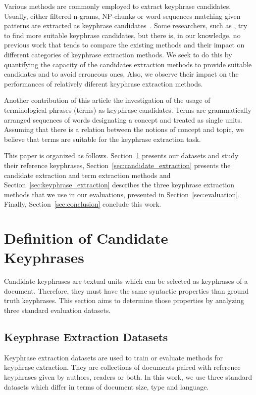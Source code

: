   Various methods are commonly employed to extract keyphrase candidates.
  Usually, either filtered n-grams, NP-chunks or word sequences matching given
  patterns are extracted as keyphrase
  candidates~\cite{hulth2003keywordextraction}. Some researchers, such as
  , try to find more
  suitable keyphrase candidates, but there is, in our knowledge, no previous
  work that tends to compare the existing methods and their impact on different
  categories of keyphrase extraction methods. We seek to do this by quantifying
  the capacity of the candidates extraction methods to provide suitable
  candidates and to avoid erroneous ones. Also, we observe their impact on the
  performances of relatively diferent keyphrase extraction methods.

  Another contribution of this article the investigation of the usage of
  terminological phrases (terms) as keyphrase candidates. Terms are
  grammatically arranged sequences of words designating a concept and treated as
  single units. Assuming that there is a relation between the notions of concept
  and topic, we believe that terms are suitable for the keyphrase extraction
  task.

  This paper is organized as follows.
  Section~\ref{sec:definition_of_candidate_keyphrases} presents our datasets and
  study their reference keyphrases, Section~\ref{sec:candidate_extraction}
  presents the candidate extraction and term extraction methods and
  Section~\ref{sec:keyphrase_extraction} describes the three keyphrase
  extraction methods that we use in our evaluations, presented in
  Section~\ref{sec:evaluation}. Finally,
  Section~\ref{sec:conclusion} conclude this work.

\section{Definition of Candidate Keyphrases}
\label{sec:definition_of_candidate_keyphrases}
  Candidate keyphrases are textual units which can be selected as keyphrases
  of a document. Therefore, they must have the same syntactic properties than
  ground truth keyphrases. This section aims to determine those properties by
  analyzing three standard evaluation datasets.

  \subsection{Keyphrase Extraction Datasets}
  \label{subsec:keyphrase_extraction_datasets}
    Keyphrase extraction datasets are used to train or evaluate methods for
    keyphrase extraction. They are collections of documents paired with
    reference keyphrases given by authors, readers or both. In this work, we use
    three standard datasets which differ in terms of document size,  type and
    language.

